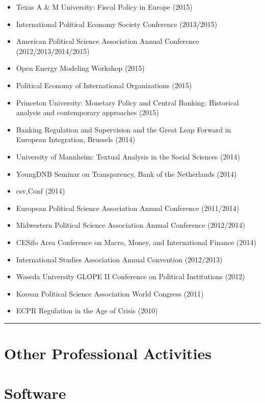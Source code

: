 \documentclass[a4paper]{article}
\begin{document}
{\begin{itemize}
    \item Texas A \& M University: Fiscal Policy in Europe (2015)
    \item International Political Economy Society Conference (2013/2015)
    \item American Political Science Association Annual Conference (2012/2013/2014/2015)
    \item Open Energy Modeling Workshop (2015)
    \item Political Economy of International Organizations (2015)
    \item Princeton University: Monetary Policy and Central Banking: Historical analysis and contemporary approaches (2015)
    \item Banking Regulation and Supervision and the Great Leap Forward in European Integration, Brussels (2014)
    \item University of Mannheim: Textual Analysis in the Social Sciences (2014)
    \item YoungDNB Seminar on Transparency, Bank of the Netherlands (2014)
    \item csv,Conf (2014)
    \item European Political Science Association Annual Conference (2011/2014)
    \item Midwestern Political Science Association Annual Conference (2012/2014)
    \item CESifo Area Conference on Macro, Money, and International Finance (2014)
    \item International Studies Association Annual Convention (2012/2013)
    \item Waseda University GLOPE II Conference on Political Institutions (2012)
    \item Korean Political Science Association World Congress (2011)
    \item ECPR Regulation in the Age of Crisis (2010)
\end{itemize}


\vspace{0.25cm}
\medskip\hrule height 1pt
\vspace{0.5cm}

\section*{Other Professional Activities}

\section*{Software}

}
\end{document}
